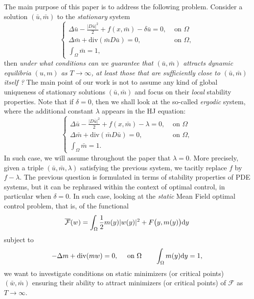 \documentclass[10pt,a4paper,nouppercase,nowrite]{article}
\numberwithin{equation}{section}
\newcommand{\di}{{\rm d}}
\theoremstyle{definition}
\begin{document}
	The main purpose of this paper is to address the following problem. Consider a solution $(\bar u, \bar m)$ to the \textit{stationary}  system
	\begin{equation}
		\begin{cases}
			\Delta \bar{u} - \frac{|D\bar{u}|^2}{2} + f(x,\bar{m}) - \delta \bar{u} = 0,& \text{ on }  \Omega \\
			\Delta \bar{m} + \text{div}(\bar{m} D\bar{u})=0,& \text{ on }  \Omega, \\
			\int_{\Omega} \bar m = 1,
		\end{cases}
		\label{statsys}
	\end{equation}
	then \textit{under what conditions can we guarantee that $(\bar u, \bar m)$ attracts dynamic equilibria $(u, m)$ as $T\to \infty$, at least those that are sufficiently close to $(\bar u, \bar m)$ itself ?} The main point of our work is not to assume any kind of global uniqueness of stationary solutions $(\bar u, \bar m)$ and focus on their \textit{local} stability properties. Note that if $\delta = 0$, then we shall look at the so-called \textit{ergodic} system, where the additional constant $\lambda$ appears in the HJ equation:
	\begin{equation}
		\begin{cases}
			\Delta \bar{u} - \frac{|D\bar{u}|^2}{2} + f(x,\bar{m}) - \lambda = 0,& \text{ on }  \Omega \\
			\Delta \bar{m} + \text{div}(\bar{m} D\bar{u})=0,& \text{ on }  \Omega, \\
			\int_{\Omega} \bar m = 1.
		\end{cases}
		\label{ergodic}
	\end{equation}
	In such case, we will assume throughout the paper that $\lambda = 0$. More precisely, given a triple $(\bar u, \bar m, \lambda)$ satisfying the previous system, we tacitly replace $f$ by $f - \lambda$.
	The previous question is formulated in terms of stability properties of PDE systems, but it can be rephrased within the context of optimal control, in particular when $\delta = 0$. In such case, looking at the \textit{static} Mean Field optimal control problem, that is, of the functional
	\[
	\overline{\mathcal F}(w) =\int_{\Omega}\frac{1}2m(y) |w(y)|^2 + F\big(y, m(y) \big) \di y  
	\]
	subject to
	\[
	- \Delta m + \text{div}(m w)=0,\quad  \text{ on } \Omega \qquad \int_{\Omega} m(y) \di y=1,
	\]
	we want to investigate conditions on static minimizers (or critical points) $(\bar w, \bar m)$ ensuring their ability to attract minimizers (or critical points) of $\mathcal F$ as $T \to \infty$.
	
\end{document}
